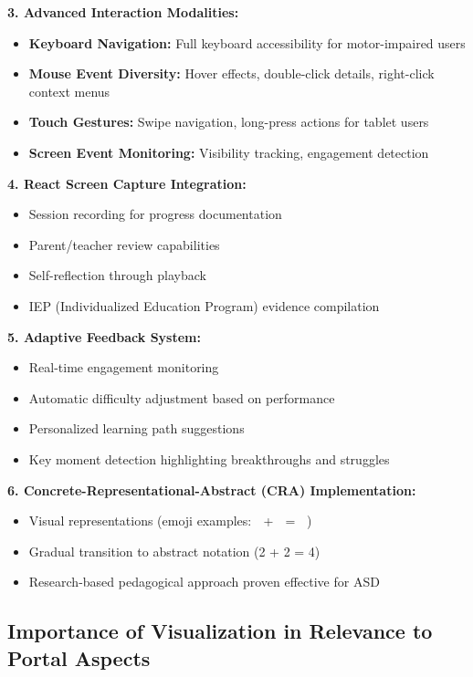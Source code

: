 \documentclass[11pt, a4paper]{article}
\begin{document}
\textbf{3. Advanced Interaction Modalities:}
\begin{itemize}[leftmargin=*, noitemsep]
    \item \textbf{Keyboard Navigation:} Full keyboard accessibility for motor-impaired users
    \item \textbf{Mouse Event Diversity:} Hover effects, double-click details, right-click context menus
    \item \textbf{Touch Gestures:} Swipe navigation, long-press actions for tablet users
    \item \textbf{Screen Event Monitoring:} Visibility tracking, engagement detection
\end{itemize}

\textbf{4. React Screen Capture Integration:}
\begin{itemize}[leftmargin=*, noitemsep]
    \item Session recording for progress documentation
    \item Parent/teacher review capabilities
    \item Self-reflection through playback
    \item IEP (Individualized Education Program) evidence compilation
\end{itemize}

\textbf{5. Adaptive Feedback System:}
\begin{itemize}[leftmargin=*, noitemsep]
    \item Real-time engagement monitoring
    \item Automatic difficulty adjustment based on performance
    \item Personalized learning path suggestions
    \item Key moment detection highlighting breakthroughs and struggles
\end{itemize}

\textbf{6. Concrete-Representational-Abstract (CRA) Implementation:}
\begin{itemize}[leftmargin=*, noitemsep]
    \item Visual representations (emoji examples: 🍎 + 🍎 = 🍎🍎)
    \item Gradual transition to abstract notation (2 + 2 = 4)
    \item Research-based pedagogical approach proven effective for ASD
\end{itemize}

\subsection{Importance of Visualization in Relevance to Portal Aspects}
\end{document}
